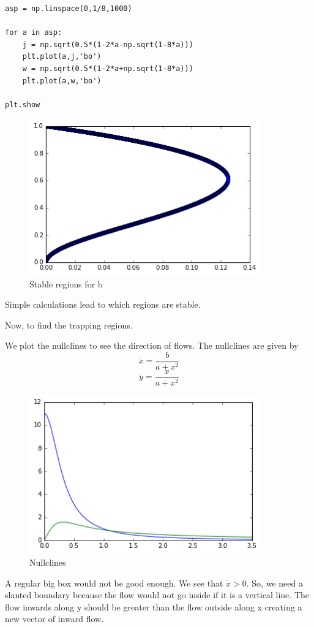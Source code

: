 \documentclass[a4paper,12pt]{article}
\begin{document}
\begin{enumerate}
\begin{lstlisting}[style=MyPythonstyle]
asp = np.linspace(0,1/8,1000)

for a in asp:
	j = np.sqrt(0.5*(1-2*a-np.sqrt(1-8*a)))
	plt.plot(a,j,'bo')
	w = np.sqrt(0.5*(1-2*a+np.sqrt(1-8*a)))
	plt.plot(a,w,'bo')

plt.show	
\end{lstlisting}

\begin{figure}[H] 
	\centering
	\includegraphics[width=10cm]{trap}
	\caption{Stable regions for b }
\end{figure}

Simple calculations lead to which regions are stable.

Now, to find the trapping regions.

We plot the nullclines to see the direction of flows.
The nullclines are given by
\[\dot{x}= \frac{b}{a+x^2}\]
\[\dot{y}= \frac{x}{a+x^2}\]

\begin{figure}[H] 
	\centering
	\includegraphics[width=10cm]{xdot}
	\caption{Nullclines }
\end{figure}
A regular big box would not be good enough. We see that $\dot{x}>0$. So, we need a slanted boundary because the flow would not go inside if it is a vertical line. The flow inwards along y should be greater than the flow outside along x creating a new vector of inward flow.


\end{enumerate}
\end{document}
